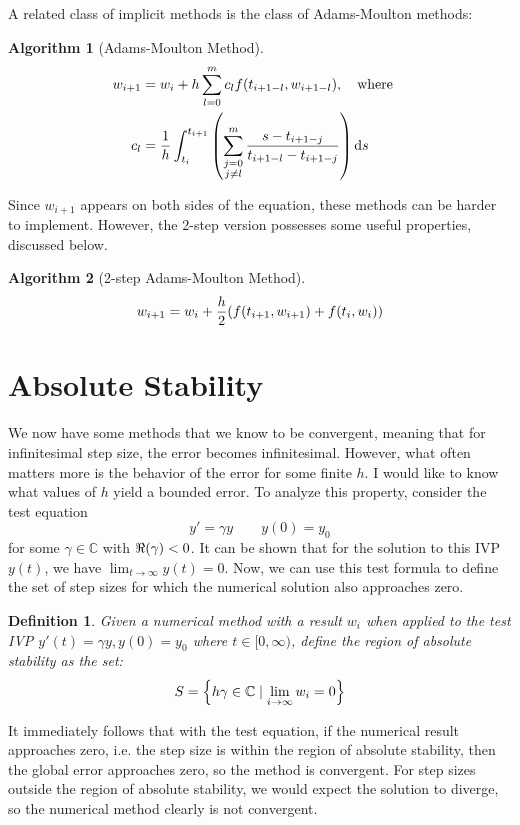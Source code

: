 \documentclass{article}
\newtheorem{definition}{Definition}[section]
\newtheorem{algorithm}{Algorithm}[section]
\newcommand{\C}{\mathbb{C}}
\newcommand{\0}{\vb{0}}
\begin{document}
A related class of implicit methods is the class of Adams-Moulton methods:
\begin{algorithm}[Adams-Moulton Method]
  \begin{align*}
    w_{i+1} & = w_i + h\sum_{l=0}^mc_lf(t_{i+1-l}, w_{i+1-l}), \qq{where}\\ 
    c_l & = \frac{1}{h}\int_{t_i}^{t_{i+1}}\qty(\sum_{\substack{j=0\\j\neq l}}^m\frac{s-t_{i+1-j}}{t_{i+1-l} - t_{i+1-j}})\dd{s}
  \end{align*}
\end{algorithm}
Since $w_{i+1}$ appears on both sides of the equation, these methods can be harder to implement. However, the 2-step version possesses some useful properties, discussed below.
\begin{algorithm}[2-step Adams-Moulton Method]
  \begin{align*}
    w_{i+1} = w_i + \frac{h}{2}\qty(f(t_{i+1}, w_{i+1}) + f(t_i, w_i))
  \end{align*}
\end{algorithm}

\section{Absolute Stability}

We now have some methods that we know to be convergent, meaning that for infinitesimal step size, the error becomes infinitesimal. However, what often matters more is the behavior of the error for some finite $h$. I would like to know what values of $h$ yield a bounded error. To analyze this property, consider the test equation
\[y' = \gamma y \qquad y(0) = y_0\]
for some $\gamma \in \C$ with $\real(\gamma) < 0$. It can be shown that for the solution to this IVP $y(t)$, we have $\lim_{t\to\infty}y(t) = 0$. Now, we can use this test formula to define the set of step sizes for which the numerical solution also approaches zero.
\begin{definition}
  Given a numerical method with a result $w_i$ when applied to the test IVP $y'(t) = \gamma y, y(0) = y_0$ where $t \in [0, \infty)$, define the region of absolute stability as the set:
  \[S = \qty{h\gamma \in \C\mid\lim_{i\to\infty}w_i = 0}\]
\end{definition}
It immediately follows that with the test equation, if the numerical result approaches zero, i.e. the step size is within the region of absolute stability, then the global error approaches zero, so the method is convergent. For step sizes outside the region of absolute stability, we would expect the solution to diverge, so the numerical method clearly is not convergent.
\end{document}
